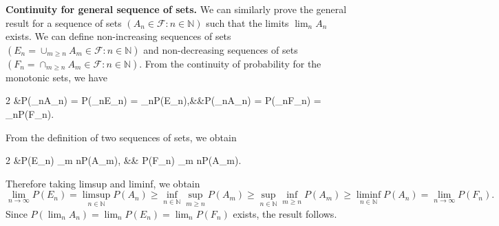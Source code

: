 \documentclass[letterpaper,10pt,english]{article}
\theoremstyle{plain}
\theoremstyle{definition}
\theoremstyle{remark}
\newcommand{\EQ}[1]{\begin{equation*}#1\end{equation*}}
\newcommand{\meq}[2]{\begin{xalignat*}{#1}#2\end{xalignat*}}
\newcommand{\N}{\mathbb{N}}
\newcommand{\sF}{\mathscr{F}}
\renewcommand{\le}{\leqslant}
\renewcommand{\ge}{\geqslant}
\begin{document}
\textbf{Continuity for general sequence of sets.} 
We can similarly prove the general result for a sequence of sets $(A_n \in \sF: n \in \N)$ such that the limits $\lim_{n}A_n$ 
exists. 
We can define non-increasing sequences of sets $(E_n = \cup_{m \ge n}A_m \in \sF: n \in \N)$ and non-decreasing sequences of sets $(F_n = \cap_{m \ge n}A_m \in \sF: n \in \N)$. 
From the continuity of probability for the monotonic sets, we have 
\meq{2}{
&P(\limsup_nA_n) = P(\cap_{n\in\N}E_n) = \lim_{n\to \infty}P(E_n),&&P(\liminf_nA_n) = P(\cup_{n\in\N}F_n) = \lim_{n\to \infty}P(F_n).
}
From the definition of two sequences of sets, we obtain 
\meq{2}{
&P(E_n) \ge \sup_{m \ge n}P(A_m), && P(F_n) \le \inf_{m \ge n}P(A_m).
} 
Therefore taking limsup and liminf, we obtain 
\EQ{
\lim_{n\to\infty}P(E_n) = \limsup_{n \in \N} P(A_n) \ge \inf_{n \in \N}\sup_{m \ge n}P(A_m) \ge  \sup_{n \in \N}\inf_{m \ge n}P(A_m) \ge \liminf_{n \in \N}P(A_n)
= \lim_{n\to\infty}P(F_n).
} 
Since $P(\lim_n A_n) = \lim_nP(E_n) = \lim_{n}P(F_n)$ exists, the result follows.
\end{document}
